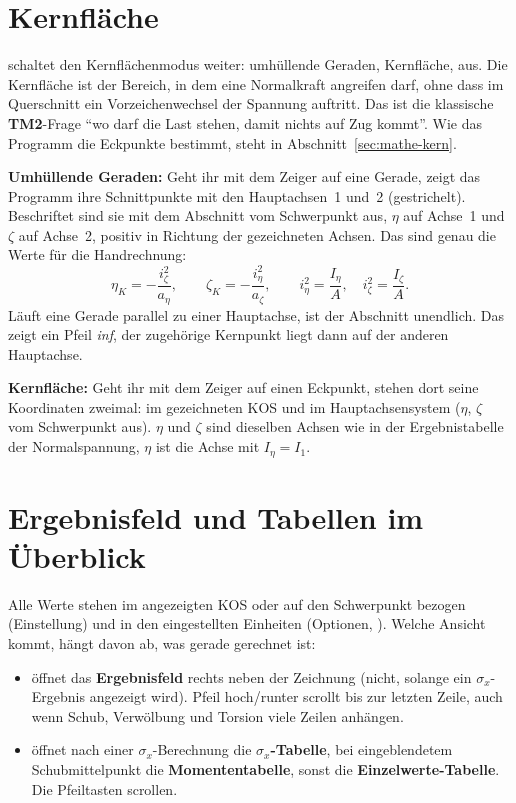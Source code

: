 \section{Kernfläche}

 schaltet den Kernflächenmodus weiter: umhüllende Geraden, Kernfläche, aus. Die
Kernfläche ist der Bereich, in dem eine Normalkraft angreifen darf, ohne dass im Querschnitt ein
Vorzeichenwechsel der Spannung auftritt. Das ist die klassische \textbf{TM2}-Frage \enquote{wo darf
die Last stehen, damit nichts auf Zug kommt}. Wie das Programm die Eckpunkte bestimmt, steht in
Abschnitt~\ref{sec:mathe-kern}.

\textbf{Umhüllende Geraden:} Geht ihr mit dem Zeiger auf eine Gerade, zeigt das Programm ihre
Schnittpunkte mit den Hauptachsen~1 und~2 (gestrichelt). Beschriftet sind sie mit dem Abschnitt
vom Schwerpunkt aus, $\eta$ auf Achse~1 und $\zeta$ auf Achse~2, positiv in Richtung der
gezeichneten Achsen. Das sind genau die Werte für die Handrechnung:
\[
  \eta_K = -\frac{i_\zeta^2}{a_\eta}, \qquad \zeta_K = -\frac{i_\eta^2}{a_\zeta}, \qquad
  i_\eta^2 = \frac{I_\eta}{A}, \quad i_\zeta^2 = \frac{I_\zeta}{A}.
\]
Läuft eine Gerade parallel zu einer Hauptachse, ist der Abschnitt unendlich. Das zeigt ein Pfeil
\emph{inf}, der zugehörige Kernpunkt liegt dann auf der anderen Hauptachse.

\textbf{Kernfläche:} Geht ihr mit dem Zeiger auf einen Eckpunkt, stehen dort seine Koordinaten
zweimal: im gezeichneten KOS und im Hauptachsensystem ($\eta$, $\zeta$ vom Schwerpunkt aus).
$\eta$ und $\zeta$ sind dieselben Achsen wie in der Ergebnistabelle der Normalspannung, $\eta$ ist
die Achse mit $I_\eta = I_1$.

\section{Ergebnisfeld und Tabellen im Überblick}\label{sec:qs-tabellen}

Alle Werte stehen im angezeigten KOS oder auf den Schwerpunkt bezogen (Einstellung) und in den eingestellten Einheiten (Optionen, ).
Welche Ansicht kommt, hängt davon ab, was gerade gerechnet ist:

\begin{itemize}
  \item {} öffnet das \textbf{Ergebnisfeld} rechts neben der Zeichnung (nicht, solange ein
        $\sigma_x$-Ergebnis angezeigt wird). Pfeil hoch/runter scrollt bis zur letzten Zeile, auch
        wenn Schub, Verwölbung und Torsion viele Zeilen anhängen.
  \item {} öffnet nach einer $\sigma_x$-Berechnung die \textbf{$\sigma_x$-Tabelle}, bei
        eingeblendetem Schubmittelpunkt die \textbf{Momententabelle}, sonst die
        \textbf{Einzelwerte-Tabelle}. Die Pfeiltasten scrollen.
\end{itemize}

